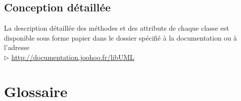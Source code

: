 \documentclass[12pt,a4paper,openany]{report}
\begin{document}
	\section{Conception détaillée}
	La description détaillée des méthodes et des attributs de chaque classe est disponible sous forme papier dans le dossier spécifié à la
	documentation ou à l'adresse \\
	$\rhd$ \url{http://documentation.joohoo.fr/libUML}
	
	\appendix
	\closeout\glossaireVar
	\chapter{Glossaire}
	\begin{sortedlist}
		
	\end{sortedlist}
\end{document}
